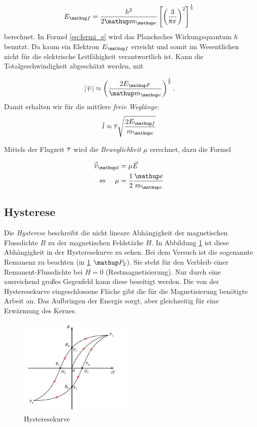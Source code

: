 \begin{equation}
\label{eq:fermi_e}
E\ua{f}=\frac{h^2}{2\map{m}\ua{e}}\left[\left(\frac{3}{8\pi}\right)^2\right]^{\frac{1}{3}}
\end{equation}
berechnet. In Formel \eqref{eq:fermi_e} wird das Plancksches Wirkungsquantum $h$ benutzt.
Da kaum ein Elektron $E\ua{f}$ erreicht und somit im Wesentlichen nicht
für die elektrische Leitfähigkeit verantwortlich ist. %
Kann die Totalgeschwindigkeit abgeschätzt werden, mit %

\begin{equation}
\label{eq:total_v}
\left|\,\overline{v}\,\right|\approx\left(\frac{2E\ua{F}}{\map{m}\ua{e}}\right)^{\frac{1}{2}}.
\end{equation}
Damit erhalten wir für die  mittlere \emph{freie Weglänge}:
\begin{equation}
\label{eq:mit_frei_weg}
\overline{l}\approx\overline{\tau}\sqrt{\frac{2E\ua{f}}{m\ua{e}}}
\end{equation}

Mittels der Flugzeit $\overline{\tau}$ wird die \emph{Beweglichkeit} $\mu$ errechnet,
dazu die Formel %

\begin{align}
\vec{\ov{v}}\ua{d}&=\mu\vec{E} \notag \\
\Leftrightarrow \quad \mu&=\frac{1}{2}\frac{\map{e}}{m\ua{e}} \label{eq:beweg}
\end{align}

\subsection{Hysterese}

Die \emph{Hysterese} beschreibt die nicht lineare
Abhängigkeit der magnetischen Flussdichte $B$ zu der
magnetischen Feldstärke $H$. In Abbildung \ref{fig: hyste} ist
diese Abhängigkeit in der Hysteresekurve zu sehen.
Bei dem Versuch ist die sogenannte Remanenz zu beachten (in \ref{fig: hyste} $\map{P}_2$). %
Sie steht für den Verbleib einer Remanent-Flussdichte bei $H=0$ (Restmagnetisierung). %
Nur durch eine ausreichend großes Gegenfeld kann diese beseitigt werden. %
Die von der Hysteresekurve eingeschlossene Fläche gibt die für die Magnetisierung benötigte
Arbeit an. Das Aufbringen der Energie sorgt, aber gleichzeitig für eine Erwärmung des Kernes. %

\begin{figure}
  \centering
  \includegraphics[width=0.5\textwidth]{pics/hystereskurve.png}
  \caption{Hysteresekurve \cite{hyste}}
  \label{fig: hyste}
\end{figure}
